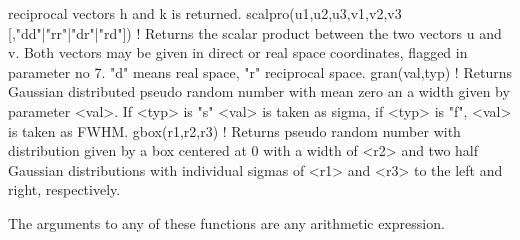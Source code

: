 \begin{MacVerbatim}
                                  reciprocal vectors h and k is returned.
scalpro(u1,u2,u3,v1,v2,v3 [,{"dd"|"rr"|"dr"|"rd"}])
                                ! Returns the scalar product between
                                  the two vectors u and v.
                                  Both vectors may be given in direct
                                  or real space coordinates, flagged
                                  in parameter no 7. "d" means real space,
                                  "r" reciprocal space.
gran(val,typ)                   ! Returns Gaussian distributed pseudo
                                  random number with mean zero an a width
                                  given by parameter <val>. If <typ> is
                                  "s" <val> is taken as sigma, if <typ>
                                  is "f", <val> is taken as FWHM.
gbox(r1,r2,r3)                  ! Returns pseudo random number with
                                  distribution given by a box centered
                                  at 0 with a width of <r2> and two half
                                  Gaussian distributions with individual
                                  sigmas of <r1> and <r3> to the left and
                                  right, respectively.
\end{MacVerbatim}
The arguments to any of these functions are any arithmetic expression. 
\par
